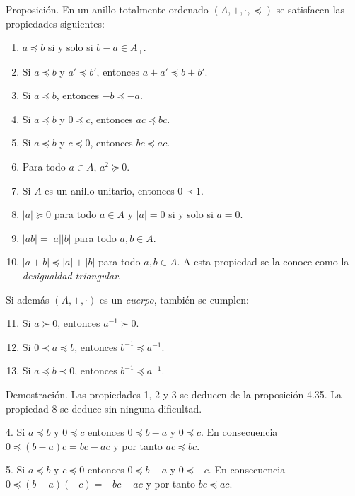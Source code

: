Proposición. En un anillo totalmente ordenado $(A, +, \cdot, \preceq)$ se
satisfacen las propiedades siguientes:

\begin{enumerate}
  \item $a \preceq b$ si y solo si $b - a \in A_+$.
  \item Si $a \preceq b$ y $a' \preceq b'$, entonces $a + a' \preceq b + b'$.
  \item Si $a \preceq b$, entonces ${-b} \preceq {-a}$.
  \item Si $a \preceq b$ y $0 \preceq c$, entonces $ac \preceq bc$.
  \item Si $a \preceq b$ y $c \preceq 0$, entonces $bc \preceq ac$.
  \item Para todo $a \in A$, $a^2 \succeq 0$.
  \item Si $A$ es un anillo unitario, entonces $0 \prec 1$.
  \item $|a| \succeq 0$ para todo $a \in A$ y $|a| = 0$ si y solo si $a =
    0$.
  \item $|ab| = |a||b|$ para todo $a, b \in A$.
  \item $|a + b| \preceq |a| + |b|$ para todo $a, b \in A$. A esta propiedad
    se la conoce como la \emph{desigualdad triangular}.
\end{enumerate}

Si además $(A, +, \cdot)$ es un \emph{cuerpo}, también se cumplen:

\begin{enumerate}
  \setcounter{enumi}{10}
  \item Si $a \succ 0$, entonces $a^{-1} \succ 0$.
  \item Si $0 \prec a \preceq b$, entonces $b^{-1} \preceq a^{-1}$.
  \item Si $a \preceq b \prec 0$, entonces $b^{-1} \preceq a^{-1}$.
\end{enumerate}


Demostración. Las propiedades 1, 2 y 3 se deducen de la proposición 4.35. La
propiedad 8 se deduce sin ninguna dificultad.

4. Si $a \preceq b$ y $0 \preceq c$ entonces $0 \preceq b - a$ y $0 \preceq
c$. En consecuencia $0 \preceq (b-a)c = bc - ac$ y por tanto $ac \preceq
bc$.

5. Si $a \preceq b$ y $c \preceq 0$ entonces $0 \preceq b - a$ y $0 \preceq
{-c}$. En consecuencia $0 \preceq (b-a)({-c}) = {-bc} + ac$ y por tanto $bc
\preceq ac$.

